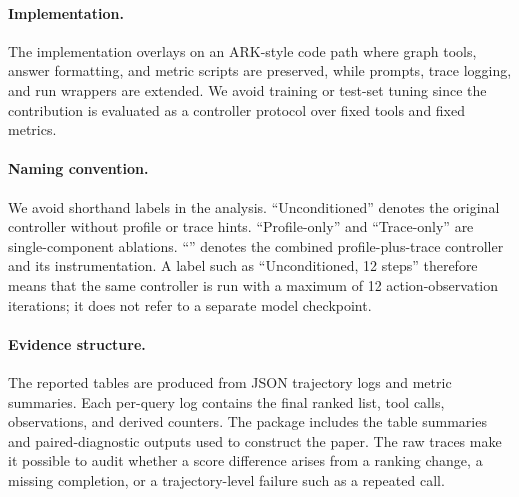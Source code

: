 \paragraph{Implementation.}
The implementation overlays \tb on an ARK-style code path where graph tools, answer formatting, and metric scripts are preserved, while prompts, trace logging, and run wrappers are extended. We avoid training or test-set tuning since the contribution is evaluated as a controller protocol over fixed tools and fixed metrics.

\paragraph{Naming convention.}
We avoid shorthand labels in the analysis. ``Unconditioned'' denotes the original controller without profile or trace hints. ``Profile-only'' and ``Trace-only'' are single-component ablations. ``\tb'' denotes the combined profile-plus-trace controller and its instrumentation. A label such as ``Unconditioned, 12 steps'' therefore means that the same controller is run with a maximum of 12 action-observation iterations; it does not refer to a separate model checkpoint.

\paragraph{Evidence structure.}
The reported tables are produced from JSON trajectory logs and metric summaries. Each per-query log contains the final ranked list, tool calls, observations, and derived counters. The package includes the table summaries and paired-diagnostic outputs used to construct the paper. The raw traces make it possible to audit whether a score difference arises from a ranking change, a missing completion, or a trajectory-level failure such as a repeated call.
